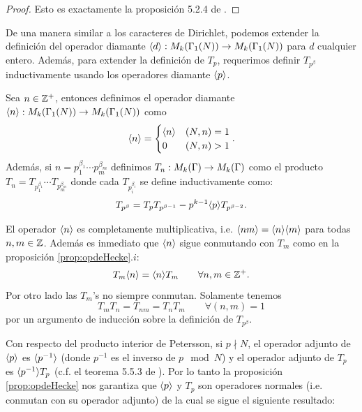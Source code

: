 \documentclass[../../tesis_maestria]{subfiles}
\begin{document}
\begin{proof}
  Esto es exactamente la proposici\'on 5.2.4 de \cite{DiamondShurmanAFCIMF}.
\end{proof}

De una manera similar a los caracteres de Dirichlet, podemos extender la definici\'on del operador
diamante $\langle d \rangle:M_k(\Gamma_1(N))\rightarrow M_k(\Gamma_1(N))$ para $d$ cualquier entero. Adem\'as, para extender
la definici\'on de $T_p$, requerimos definir $T_{p^{\beta}}$ inductivamente usando los operadores
diamante $\langle p \rangle$.
\begin{defin}
  Sea $n\in\mathbb{Z}^+$, entonces definimos el operador diamante
  $\langle n \rangle:M_k(\Gamma_1(N))\rightarrow M_k(\Gamma_1(N))$ como
  \[
    \langle n \rangle=
    \begin{cases}
      \langle n \rangle & (N,n)=1\\
      0 & (N,n)>1
    \end{cases}.
  \]
  Adem\'as, si $n=p_1^{\beta_1}\cdots p_m^{\beta_m}$ definimos $T_n:M_k(\Gamma)\rightarrow M_k(\Gamma)$
  como el producto $T_n=T_{p_1^{\beta_1}}\cdots T_{p_m^{\beta_m}}$ donde cada $T_{p_i^{\beta_i}}$ se
  define inductivamente como:
  \[
    T_{p^{\beta}}=T_pT_{p^{\beta-1}}-p^{k-1}\langle p \rangle T_{p^{\beta-2}}.
  \]
\end{defin}

\begin{notas}
  El operador $\langle n \rangle$ es completamente multiplicativa, i.e. $\langle nm \rangle=\langle n \rangle\langle m \rangle$ para todas
  $n,m\in\mathbb{Z}$. Adem\'as es inmediato que $\langle n \rangle$ sigue conmutando con $T_m$ como en la proposici\'on
  \ref{prop:opdeHecke}.$i$:
  \begin{equation}
    \label{eq:Tnconmuta}
    T_m\langle n \rangle=\langle n \rangle T_m\qquad\forall n,m\in\mathbb{Z}^+.
  \end{equation}
  Por otro lado las $T_m$'s no siempre conmutan. Solamente tenemos
  \begin{equation}
    \label{eq:Tnconmutaprimo}
    T_mT_n=T_{nm}=T_nT_m\qquad\forall (n,m)=1
  \end{equation}
  por un argumento de inducci\'on sobre la definici\'on de $T_{p^{\beta}}$.
\end{notas}
\begin{nota}
  Con respecto del producto interior de Petersson, si $p\nmid N$, el operador adjunto de
  $\langle p \rangle$ es $\langle p^{-1} \rangle$ (donde $p^{-1}$ es el inverso de $p\mod N$) y el operador adjunto de $T_p$ es $\langle p^{-1} \rangle T_p$ (c.f. el teorema
  5.5.3 de \cite{DiamondShurmanAFCIMF}). Por lo tanto la proposici\'on \ref{prop:opdeHecke} nos
  garantiza que $\langle p \rangle$ y $T_p$ son operadores normales (i.e. conmutan con su operador adjunto)
  de la cual se sigue el siguiente resultado:
\end{nota}
\end{document}
